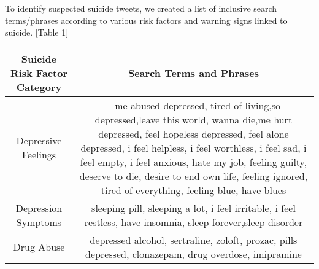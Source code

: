 \documentclass[11pt]{article}
\begin{document}
To identify suspected suicide tweets, we created a list of inclusive search terms/phrases according to various risk factors and warning signs linked to suicide. [Table 1]
\begin{table*}
    \centering
    \begin{tabulary}{500pt}{|C|C|}
    \hline
    \textbf{Suicide Risk Factor Category} & \textbf{Search Terms and Phrases} \\ \hline
    Depressive Feelings & ~  me abused depressed, tired of living,so depressed,leave this world, wanna die,me hurt depressed, feel hopeless depressed, feel alone depressed, i feel helpless, i feel worthless, i feel sad, i feel empty, i feel anxious, hate my job, feeling guilty, deserve to die, desire to end own life, feeling ignored, tired of everything, feeling blue, have blues                                                                                                                                                                                                                                                                                                                                                                                                                                                                         \\ \hline
    Depression Symptoms                   & sleeping pill, sleeping a lot, i feel irritable, i feel restless, have insomnia, sleep forever,sleep disorder                                                                                                                                                                                                                                                                                                                                                                                                                                                                                                                                                                                                                                                                                                                             \\ \hline
   Drug Abuse                            & depressed alcohol, sertraline, zoloft, prozac, pills depressed, clonazepam, drug overdose, imipramine                                                                                                                                                                                                                                                                                                                                                                                                                                                                                                                                                                                                                                                                                                                                     \\ \hline

\end{tabulary}
\end{table*}
\end{document}
